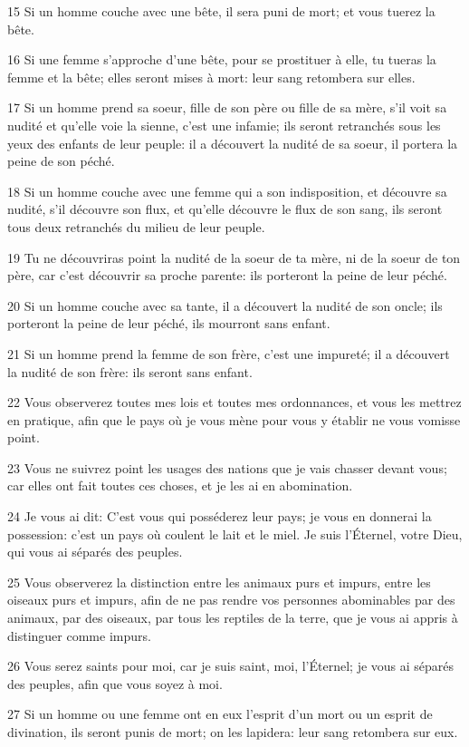 \par 15 Si un homme couche avec une bête, il sera puni de mort; et vous tuerez la bête.
\par 16 Si une femme s'approche d'une bête, pour se prostituer à elle, tu tueras la femme et la bête; elles seront mises à mort: leur sang retombera sur elles.
\par 17 Si un homme prend sa soeur, fille de son père ou fille de sa mère, s'il voit sa nudité et qu'elle voie la sienne, c'est une infamie; ils seront retranchés sous les yeux des enfants de leur peuple: il a découvert la nudité de sa soeur, il portera la peine de son péché.
\par 18 Si un homme couche avec une femme qui a son indisposition, et découvre sa nudité, s'il découvre son flux, et qu'elle découvre le flux de son sang, ils seront tous deux retranchés du milieu de leur peuple.
\par 19 Tu ne découvriras point la nudité de la soeur de ta mère, ni de la soeur de ton père, car c'est découvrir sa proche parente: ils porteront la peine de leur péché.
\par 20 Si un homme couche avec sa tante, il a découvert la nudité de son oncle; ils porteront la peine de leur péché, ils mourront sans enfant.
\par 21 Si un homme prend la femme de son frère, c'est une impureté; il a découvert la nudité de son frère: ils seront sans enfant.
\par 22 Vous observerez toutes mes lois et toutes mes ordonnances, et vous les mettrez en pratique, afin que le pays où je vous mène pour vous y établir ne vous vomisse point.
\par 23 Vous ne suivrez point les usages des nations que je vais chasser devant vous; car elles ont fait toutes ces choses, et je les ai en abomination.
\par 24 Je vous ai dit: C'est vous qui posséderez leur pays; je vous en donnerai la possession: c'est un pays où coulent le lait et le miel. Je suis l'Éternel, votre Dieu, qui vous ai séparés des peuples.
\par 25 Vous observerez la distinction entre les animaux purs et impurs, entre les oiseaux purs et impurs, afin de ne pas rendre vos personnes abominables par des animaux, par des oiseaux, par tous les reptiles de la terre, que je vous ai appris à distinguer comme impurs.
\par 26 Vous serez saints pour moi, car je suis saint, moi, l'Éternel; je vous ai séparés des peuples, afin que vous soyez à moi.
\par 27 Si un homme ou une femme ont en eux l'esprit d'un mort ou un esprit de divination, ils seront punis de mort; on les lapidera: leur sang retombera sur eux.

